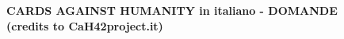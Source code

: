 \documentclass[a4paper,12pt]{article}
\begin{document}

\pagebreak

\begin{center}
 \bf{CARDS AGAINST HUMANITY in italiano - DOMANDE \\ (credits to CaH42project.it)}
\end{center}
\end{document}
